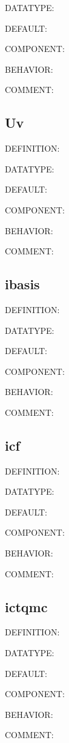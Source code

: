{\color{green}DATATYPE:}

{\color{blue}DEFAULT:}

{\color{brown}COMPONENT:}

{\color{purple}BEHAVIOR:}

{\color{olive}COMMENT:}

\subsection{Uv}
{\color{red}DEFINITION:}

{\color{green}DATATYPE:}

{\color{blue}DEFAULT:}

{\color{brown}COMPONENT:}

{\color{purple}BEHAVIOR:}

{\color{olive}COMMENT:}

\subsection{ibasis}
{\color{red}DEFINITION:}

{\color{green}DATATYPE:}

{\color{blue}DEFAULT:}

{\color{brown}COMPONENT:}

{\color{purple}BEHAVIOR:}

{\color{olive}COMMENT:}

\subsection{icf}
{\color{red}DEFINITION:}

{\color{green}DATATYPE:}

{\color{blue}DEFAULT:}

{\color{brown}COMPONENT:}

{\color{purple}BEHAVIOR:}

{\color{olive}COMMENT:}

\subsection{ictqmc}
{\color{red}DEFINITION:}

{\color{green}DATATYPE:}

{\color{blue}DEFAULT:}

{\color{brown}COMPONENT:}

{\color{purple}BEHAVIOR:}

{\color{olive}COMMENT:}


